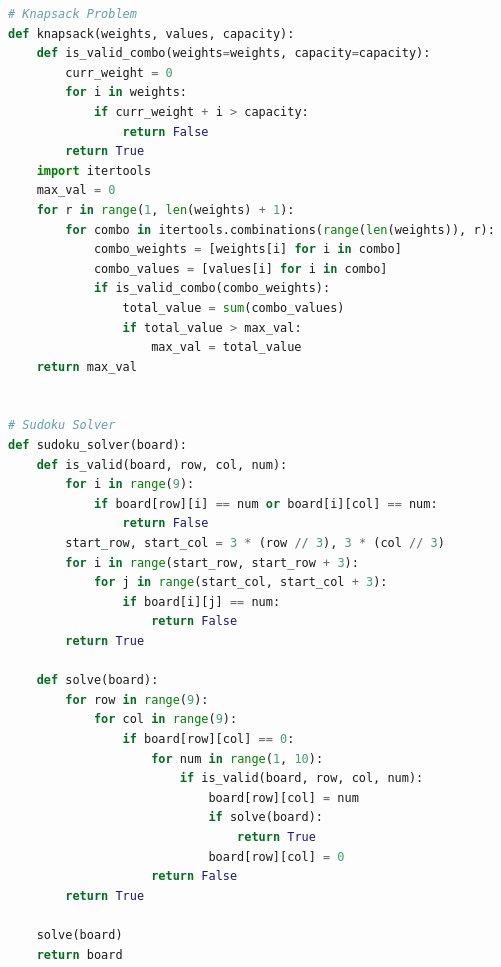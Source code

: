 \documentclass[openany]{book}
\begin{document}
\begin{lstlisting}[language=Python]
# Knapsack Problem
def knapsack(weights, values, capacity):
    def is_valid_combo(weights=weights, capacity=capacity):
        curr_weight = 0
        for i in weights:
            if curr_weight + i > capacity:
                return False
        return True
    import itertools
    max_val = 0
    for r in range(1, len(weights) + 1):
        for combo in itertools.combinations(range(len(weights)), r):
            combo_weights = [weights[i] for i in combo]
            combo_values = [values[i] for i in combo]
            if is_valid_combo(combo_weights):
                total_value = sum(combo_values)
                if total_value > max_val:
                    max_val = total_value
    return max_val


# Sudoku Solver
def sudoku_solver(board):
    def is_valid(board, row, col, num):
        for i in range(9):
            if board[row][i] == num or board[i][col] == num:
                return False
        start_row, start_col = 3 * (row // 3), 3 * (col // 3)
        for i in range(start_row, start_row + 3):
            for j in range(start_col, start_col + 3):
                if board[i][j] == num:
                    return False
        return True

    def solve(board):
        for row in range(9):
            for col in range(9):
                if board[row][col] == 0:
                    for num in range(1, 10):
                        if is_valid(board, row, col, num):
                            board[row][col] = num
                            if solve(board):
                                return True
                            board[row][col] = 0
                    return False
        return True

    solve(board)
    return board

\end{lstlisting}
\end{document}
